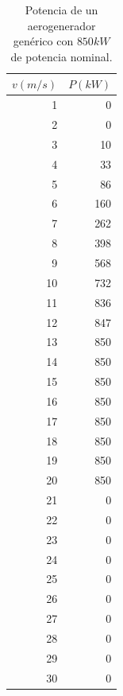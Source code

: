 \documentclass{IEEEtran}
\begin{document}
\begin{table}[H]
    \centering
    \label{Tabla: Curva de potencia}
    \caption{Potencia de un aerogenerador genérico con $850 kW$ de potencia nominal.}
    \begin{tabular}{|r | r|}
        \hline
        $v(m/s)$ & $P(kW)$ \\
        \hline
        1 & 0 \\
        2 & 0 \\
        3 & 10 \\ 
        4 & 33 \\
        5 & 86 \\
        6 & 160 \\
        7 & 262 \\ 
        8 & 398 \\
        9 & 568 \\
        10 & 732 \\ 
        11 & 836 \\
        12 & 847 \\
        13 & 850 \\
        14 & 850 \\
        15 & 850 \\
        16 & 850 \\
        17 & 850 \\
        18 & 850 \\
        19 & 850 \\
        20 & 850 \\
        21 & 0 \\
        22 & 0 \\
        23 & 0 \\
        24 & 0 \\
        25 & 0 \\
        26 & 0 \\
        27 & 0 \\
        28 & 0 \\
        29 & 0 \\
        30 & 0 \\
        \hline
    \end{tabular}
\end{table}
\end{document}
